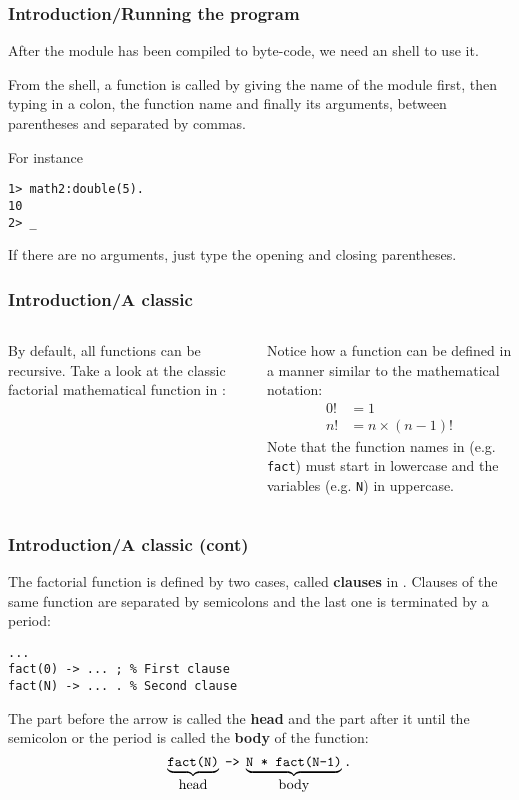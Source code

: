 %
\begin{frame}[containsverbatim]
\frametitle{Introduction/Running the program}

After the module has been compiled to byte-code, we need an \Erlang
shell to use it.

\bigskip

From the \Erlang shell, a function is called by giving the name of the
module first, then typing in a colon, the function name and finally
its arguments, between parentheses and separated by commas.

\bigskip

For instance
\begin{verbatim}
1> math2:double(5).
10
2> _
\end{verbatim}
If there are no arguments, just type the opening and closing
parentheses.

\end{frame}

%
\begin{frame}
\frametitle{Introduction/A classic}

\label{fact}

\begin{columns}
   By default, all functions can be
  recursive. Take a look at the classic factorial mathematical
  function in \Erlang:

   Notice how a function can be defined in a
  manner similar to the mathematical notation:
  \begin{align*}
    0! &= 1\\
    n! &= n \times (n-1)!
  \end{align*}
  Note that the function names in \Erlang (e.g. \texttt{fact}) must
  start in lowercase and the variables (e.g. \texttt{N}) in uppercase.

\end{columns}

\end{frame}

%
\begin{frame}[containsverbatim]
\frametitle{Introduction/A classic (cont)}

The factorial function is defined by two cases, called
\textbf{clauses} in \Erlang. Clauses of the same function are
separated by semicolons and the last one is terminated by a period:
\begin{verbatim}
...
fact(0) -> ... ; % First clause
fact(N) -> ... . % Second clause
\end{verbatim}
The part before the arrow is called the \textbf{head} and the part
after it until the semicolon or the period is called the \textbf{body}
of the function:
\[
\underbrace{\texttt{fact(N)}}_{\textrm{\normalsize head}} \;
\texttt{->} \; \underbrace{\texttt{N *
    fact(N-1)}}_{\textrm{\normalsize body}}\texttt{.}
\]

\end{frame}

